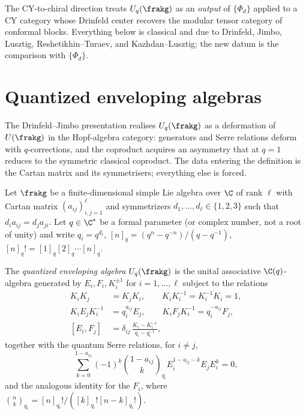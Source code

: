 The CY-to-chiral direction treats $U_q(\frakg)$ as an \emph{output} of
$\{\Phi_d\}$ applied to a CY category whose Drinfeld center recovers
the modular tensor category of conformal blocks. Everything below is
classical and due to Drinfeld, Jimbo, Lusztig,
Reshetikhin--Turaev, and Kazhdan--Lusztig; the new datum is the
comparison with $\{\Phi_d\}$.

\section{Quantized enveloping algebras}
\label{sec:qgf-quantized-enveloping}

The Drinfeld--Jimbo presentation realises $U_q(\frakg)$ as a deformation of $U(\frakg)$ in the Hopf-algebra category: generators and Serre relations deform with $q$-corrections, and the coproduct acquires an asymmetry that at $q = 1$ reduces to the symmetric classical coproduct. The data entering the definition is the Cartan matrix and its symmetrisers; everything else is forced.

Let $\frakg$ be a finite-dimensional simple Lie algebra over $\C$ of rank $\ell$ with Cartan matrix $(a_{ij})_{i,j=1}^{\ell}$ and symmetrizers $d_1, \ldots, d_\ell \in \{1, 2, 3\}$ such that $d_i a_{ij} = d_j a_{ji}$. Let $q \in \C^*$ be a formal parameter (or complex number, not a root of unity) and write $q_i = q^{d_i}$, $[n]_q = (q^n - q^{-n})/(q - q^{-1})$, $[n]_q! = [1]_q [2]_q \cdots [n]_q$.

\begin{definition}
\label{def:qgf-quantum-group}
\label{def:qgf-drinfeld-jimbo}
The \emph{quantized enveloping algebra} $U_q(\frakg)$ is the unital associative $\C(q)$-algebra generated by $E_i, F_i, K_i^{\pm 1}$ for $i = 1, \ldots, \ell$ subject to the relations
\begin{align}
 K_i K_j &= K_j K_i, \qquad K_i K_i^{-1} = K_i^{-1} K_i = 1, \\
 K_i E_j K_i^{-1} &= q_i^{a_{ij}} E_j, \qquad K_i F_j K_i^{-1} = q_i^{-a_{ij}} F_j, \\
 [E_i, F_j] &= \delta_{ij} \, \frac{K_i - K_i^{-1}}{q_i - q_i^{-1}},
\end{align}
together with the quantum Serre relations, for $i \ne j$,
\begin{equation}
 \sum_{k=0}^{1 - a_{ij}} (-1)^k \binom{1 - a_{ij}}{k}_{q_i} E_i^{1 - a_{ij} - k} E_j E_i^k = 0,
 \label{eq:qgf-quantum-serre-E}
\end{equation}
and the analogous identity for the $F_i$, where $\binom{n}{k}_{q_i} = [n]_{q_i}!/([k]_{q_i}! [n-k]_{q_i}!)$.
\end{definition}

